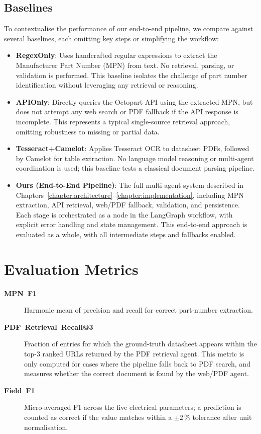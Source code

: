 \subsection{Baselines}
To contextualise the performance of our end-to-end pipeline, we compare against several baselines, each omitting key steps or simplifying the workflow:
\begin{itemize}
  \item \textbf{RegexOnly}: Uses handcrafted regular expressions to extract the Manufacturer Part Number (MPN) from text. No retrieval, parsing, or validation is performed. This baseline isolates the challenge of part number identification without leveraging any retrieval or reasoning.
  \item \textbf{APIOnly}: Directly queries the Octopart API using the extracted MPN, but does not attempt any web search or PDF fallback if the API response is incomplete. This represents a typical single-source retrieval approach, omitting robustness to missing or partial data.
  \item \textbf{Tesseract+Camelot}: Applies Tesseract OCR to datasheet PDFs, followed by Camelot for table extraction. No language model reasoning or multi-agent coordination is used; this baseline tests a classical document parsing pipeline.
  \item \textbf{Ours (End-to-End Pipeline)}: The full multi-agent system described in Chapters~\ref{chapter:architecture}–\ref{chapter:implementation}, including MPN extraction, API retrieval, web/PDF fallback, validation, and persistence. Each stage is orchestrated as a node in the LangGraph workflow, with explicit error handling and state management. This end-to-end approach is evaluated as a whole, with all intermediate steps and fallbacks enabled.
\end{itemize}

\section{Evaluation Metrics}
\begin{description}
  \item[\textbf{MPN~F1}] Harmonic mean of precision and recall for correct part-number extraction.
  \item[\textbf{PDF~Retrieval~Recall@3}] Fraction of entries for which the ground-truth datasheet appears within the top-3 ranked URLs returned by the PDF retrieval agent. This metric is only computed for cases where the pipeline falls back to PDF search, and measures whether the correct document is found by the web/PDF agent.
  \item[\textbf{Field~F1}] Micro-averaged F1 across the five electrical parameters; a prediction is counted as correct if the value matches within a $\pm2\,\%$ tolerance after unit normalisation.
\end{description}

